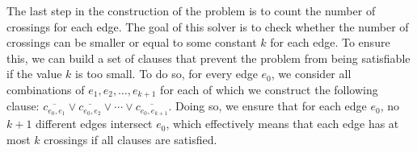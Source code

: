 \documentclass{article}
\begin{document}
    The last step in the construction of the problem is to count the number of crossings for each edge.
    The goal of this solver is to check whether the number of crossings can be smaller or equal to some constant $k$ for each edge.
    To ensure this, we can build a set of clauses that prevent the problem from being satisfiable if the value $k$ is too small.
    To do so, for every edge $e_0$, we consider all combinations of $e_1, e_2, \dots, e_{k+1}$ for each of which we construct the following clause: $\overline{c_{e_0, e_1}} \lor \overline{c_{e_0, e_2}} \lor \cdots\lor \overline{c_{e_0, e_{k+1}}}$.
    Doing so, we ensure that for each edge $e_0$, no $k + 1$ different edges intersect $e_0$, which effectively means that each edge has at most $k$ crossings if all clauses are satisfied.

\end{document}

